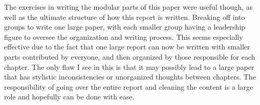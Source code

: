 The exercises in writing the modular parts of this paper were useful though, as well as the ultimate structure of how this report is written. Breaking off into groups to write one large paper, with each smaller group having a leadership figure to oversee the organization and writing process. This seems especially effective due to the fact that one large report can now be written with smaller parts contributed by everyone, and then organized by those responsible for each chapter. The only flaw I see in this is that it may possibly lead to a large paper that has stylistic inconsistencies or unorganized thoughts between chapters. The responsibility of going over the entire report and cleaning the content is a large role and hopefully can be done with ease.
